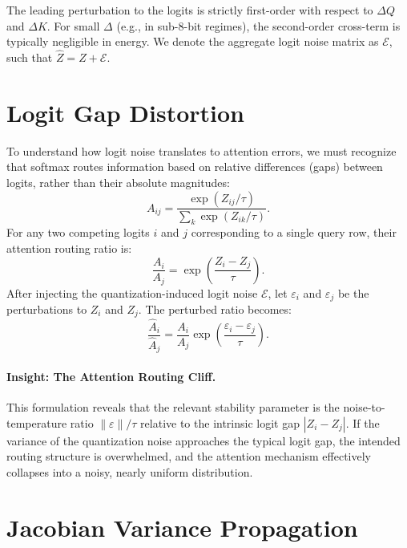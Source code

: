 The leading perturbation to the logits is strictly first-order with respect to $\Delta Q$ and $\Delta K$. For small $\Delta$ (e.g., in sub-8-bit regimes), the second-order cross-term is typically negligible in energy. We denote the aggregate logit noise matrix as $\mathcal{E}$, such that $\widehat{Z} = Z + \mathcal{E}$.

\section{Logit Gap Distortion}

To understand how logit noise translates to attention errors, we must recognize that softmax routes information based on relative differences (gaps) between logits, rather than their absolute magnitudes:
\[
A_{ij}
=
\frac{\exp(Z_{ij}/\tau)}
{\sum_k \exp(Z_{ik}/\tau)}.
\]
For any two competing logits $i$ and $j$ corresponding to a single query row, their attention routing ratio is:
\[
\frac{A_i}{A_j}
=
\exp\!\left(\frac{Z_i - Z_j}{\tau}\right).
\]
After injecting the quantization-induced logit noise $\mathcal{E}$, let $\varepsilon_i$ and $\varepsilon_j$ be the perturbations to $Z_i$ and $Z_j$. The perturbed ratio becomes:
\[
\frac{\widehat{A}_i}{\widehat{A}_j}
=
\frac{A_i}{A_j}
\exp\!\left(\frac{\varepsilon_i - \varepsilon_j}{\tau}\right).
\]

\paragraph{Insight: The Attention Routing Cliff.}
This formulation reveals that the relevant stability parameter is the noise-to-temperature ratio $\|\varepsilon\|/\tau$ relative to the intrinsic logit gap $|Z_i - Z_j|$. If the variance of the quantization noise approaches the typical logit gap, the intended routing structure is overwhelmed, and the attention mechanism effectively collapses into a noisy, nearly uniform distribution.

\section{Jacobian Variance Propagation}

